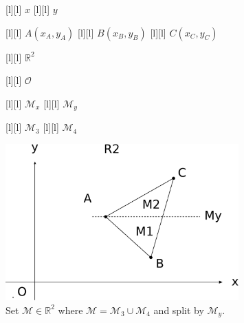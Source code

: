 \begin{figure}[ht!]
	\centering
	\footnotesize

	[l] {$x$}
	[l] {$y$}

	[l] {$A(x_A,y_A)$}
	[l] {$B(x_B,y_B)$}
	[l] {$C(x_C,y_C)$}

	[l] {$\mathbb{R}^2$}

	[l] {$\mathcal{O}$}

	[l] {$\mathcal{M}_x$}
	[l] {$\mathcal{M}_y$}

	[l] {$\mathcal{M}_3$}
	[l] {$\mathcal{M}_4$}

	\includegraphics[width=0.8\textwidth]{setAinR2_Ay.eps}
	\caption{Set $\mathcal{M} \in \mathbb{R}^2$ where
		$\mathcal{M} = \mathcal{M}_{3} \cup \mathcal{M}_{4}$
		and split by $\mathcal{M}_y$.}
	\label{\LABEL}
\end{figure}
